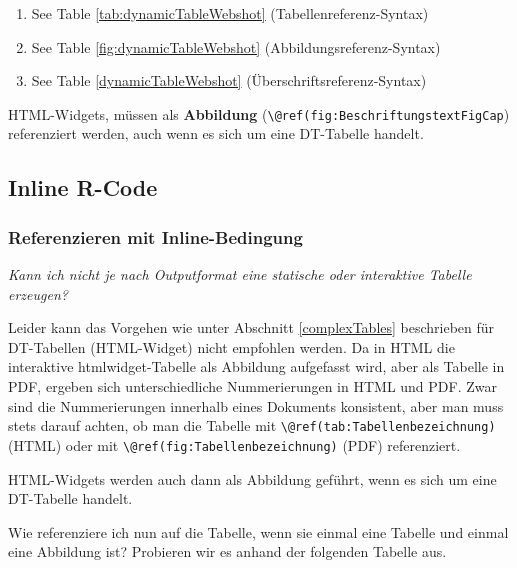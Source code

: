 \documentclass[]{book}
\providecommand{\tightlist}{%
  \setlength{\itemsep}{0pt}\setlength{\parskip}{0pt}}
\theoremstyle{definition}
\theoremstyle{definition}
\theoremstyle{remark}
\let\BeginKnitrBlock\begin \let\EndKnitrBlock\end
\begin{document}
\begin{enumerate}
\def\labelenumi{\arabic{enumi}.}
\tightlist
\item
  See Table \ref{tab:dynamicTableWebshot} (Tabellenreferenz-Syntax)
\item
  See Table \ref{fig:dynamicTableWebshot} (Abbildungsreferenz-Syntax)
\item
  See Table \ref{dynamicTableWebshot} (Überschriftsreferenz-Syntax)
\end{enumerate}

\BeginKnitrBlock{rmdcaution}
HTML-Widgets, müssen als \textbf{Abbildung}
(\texttt{\textbackslash{}@ref(fig:BeschriftungstextFigCap}) referenziert
werden, auch wenn es sich um eine DT-Tabelle handelt.
\EndKnitrBlock{rmdcaution}

\subsection{Inline R-Code}\label{inline-r-code}

\subsubsection{Referenzieren mit
Inline-Bedingung}\label{referenzieren-mit-inline-bedingung}

\emph{Kann ich nicht je nach Outputformat eine statische oder
interaktive Tabelle erzeugen?}

Leider kann das Vorgehen wie unter Abschnitt \ref{complexTables}
beschrieben für DT-Tabellen (HTML-Widget) nicht empfohlen werden. Da in
HTML die interaktive htmlwidget-Tabelle als Abbildung aufgefasst wird,
aber als Tabelle in PDF, ergeben sich unterschiedliche Nummerierungen in
HTML und PDF. Zwar sind die Nummerierungen innerhalb eines Dokuments
konsistent, aber man muss stets darauf achten, ob man die Tabelle mit
\texttt{\textbackslash{}@ref(tab:Tabellenbezeichnung)} (HTML) oder mit
\texttt{\textbackslash{}@ref(fig:Tabellenbezeichnung)} (PDF)
referenziert.

\BeginKnitrBlock{rmdimportant}
HTML-Widgets werden auch dann als Abbildung geführt, wenn es sich um
eine DT-Tabelle handelt.
\EndKnitrBlock{rmdimportant}

Wie referenziere ich nun auf die Tabelle, wenn sie einmal eine Tabelle
und einmal eine Abbildung ist? Probieren wir es anhand der folgenden
Tabelle aus.
\end{document}
